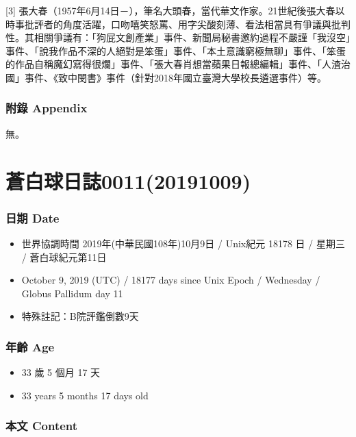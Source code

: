 \documentclass[a5paper, 12pt
]{book}
\providecommand{\tightlist}{%
  \setlength{\itemsep}{0pt}\setlength{\parskip}{0pt}}
\begin{document}
{[}3{]}
張大春（1957年6月14日－），筆名大頭春，當代華文作家。21世紀後張大春以時事批評者的角度活躍，口吻嘻笑怒罵、用字尖酸刻薄、看法相當具有爭議與批判性。其相關爭議有：「狗屁文創產業」事件、新聞局秘書邀約過程不嚴謹「我沒空」事件、「說我作品不深的人絕對是笨蛋」事件、「本土意識窮極無聊」事件、「笨蛋的作品自稱魔幻寫得很爛」事件、「張大春肖想當蘋果日報總編輯」事件、「人渣治國」事件、《致中閔書》事件（針對2018年國立臺灣大學校長遴選事件）等。

\hypertarget{ux9644ux9304-appendix-3}{%
\subsubsection{附錄 Appendix}\label{ux9644ux9304-appendix-3}}

無。

\hypertarget{ux84bcux767dux7403ux65e5ux8a8c001120191009}{%
\section{蒼白球日誌0011(20191009)}\label{ux84bcux767dux7403ux65e5ux8a8c001120191009}}

\hypertarget{ux65e5ux671f-date-10}{%
\subsubsection{日期 Date}\label{ux65e5ux671f-date-10}}

\begin{itemize}
\tightlist
\item
  世界協調時間 2019年(中華民國108年)10月9日 / Unix紀元 18178 日 / 星期三
  / 蒼白球紀元第11日
\item
  October 9, 2019 (UTC) / 18177 days since Unix Epoch / Wednesday /
  Globus Pallidum day 11
\item
  特殊註記：B院評鑑倒數9天
\end{itemize}

\hypertarget{ux5e74ux9f61-age-10}{%
\subsubsection{年齡 Age}\label{ux5e74ux9f61-age-10}}

\begin{itemize}
\tightlist
\item
  33 歲 5 個月 17 天
\item
  33 years 5 months 17 days old
\end{itemize}

\hypertarget{ux672cux6587-content-10}{%
\subsubsection{本文 Content}\label{ux672cux6587-content-10}}
\end{document}
